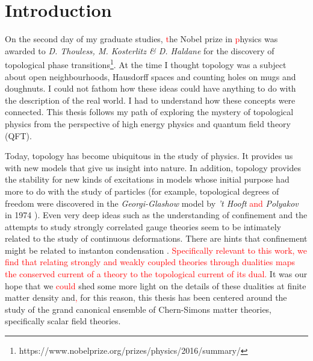 
    \graphicspath{{Introduction_Folder/figures/PNG/}{Introduction_Folder/figures/PDF/}{Introduction_Folder/figures/}}

\chapter*{Introduction}


On the second day of my graduate studies, \textcolor{red}{t}he Nobel prize in \textcolor{red}{p}hysics was awarded to \textit{D. Thouless, M. Kosterlitz \& D. Haldane} for the discovery of topological phase transitions\footnote{https://www.nobelprize.org/prizes/physics/2016/summary/}. At the time I thought topology was a subject about open neighbourhoods, Hausdorff spaces and counting holes on mugs and doughnuts. I could not fathom how these ideas could have anything to do with the description of the real world. I had to understand how these concepts were connected. This thesis follows my path of exploring the mystery of topological physics from the perspective of high energy physics and quantum field theory (QFT).

Today, topology has become ubiquitous in the study of physics. It provides us with new models that give us insight into nature. In addition, topology provides the stability for new kinds of excitations in models whose initial purpose had more to do with the study of particles (for example, topological degrees of freedom were discovered in the \textit{Georgi-Glashow} model \cite{Georgi:1974sy} by \textit{'t Hooft} \textcolor{red}{and} \textit{Polyakov} in 1974 \cite{Polyakov:1974ek, tHooft:1974kcl}). Even very deep ideas such as the understanding of confinement and the attempts to study strongly correlated gauge theories seem to be intimately related to the study of continuous deformations. There are hints that confinement might be related to instanton condensation \cite{Polyakov:1976fu}. \textcolor{red}{Specifically relevant to this work, we find that relating strongly and weakly coupled theories through dualities maps the conserved current of a theory to the topological current of its dual.} It was our hope that we \textcolor{red}{could} shed some more light on the details of these dualities at finite matter density and\textcolor{red}{,} for this reason, this thesis has been centered around the study of the grand canonical ensemble of Chern-Simons matter theories, specifically scalar field theories.

